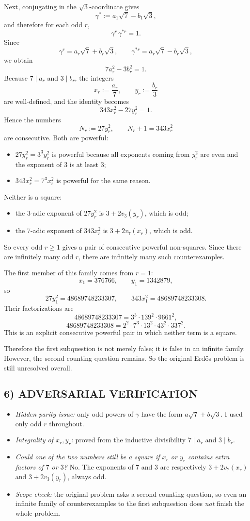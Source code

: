 Next, conjugating in the $\sqrt3$-coordinate gives
\[
\gamma^{\ast}:=a_1\sqrt7-b_1\sqrt3,
\]
and therefore for each odd $r$,
\[
\gamma^r\,\gamma^{\ast r}=1.
\]
Since
\[
\gamma^r=a_r\sqrt7+b_r\sqrt3,
\qquad
\gamma^{\ast r}=a_r\sqrt7-b_r\sqrt3,
\]
we obtain
\[
7a_r^2-3b_r^2=1.
\]
Because $7\mid a_r$ and $3\mid b_r$, the integers
\[
x_r:=\frac{a_r}{7},\qquad y_r:=\frac{b_r}{3}
\]
are well-defined, and the identity becomes
\[
343x_r^2-27y_r^2=1.
\]
Hence the numbers
\[
N_r:=27y_r^2,
\qquad
N_r+1=343x_r^2
\]
are consecutive.
Both are powerful:
\begin{itemize}
\item $27y_r^2=3^3y_r^2$ is powerful because all exponents coming from $y_r^2$ are even and the exponent of $3$ is at least $3$;
\item $343x_r^2=7^3x_r^2$ is powerful for the same reason.
\end{itemize}
Neither is a square:
\begin{itemize}
\item the $3$-adic exponent of $27y_r^2$ is $3+2v_3(y_r)$, which is odd;
\item the $7$-adic exponent of $343x_r^2$ is $3+2v_7(x_r)$, which is odd.
\end{itemize}
So every odd $r\ge 1$ gives a pair of consecutive powerful non-squares.
Since there are infinitely many odd $r$, there are infinitely many such counterexamples.

The first member of this family comes from $r=1$:
\[
x_1=376766,\qquad y_1=1342879,
\]
so
\[
27y_1^2=48689748233307,
\qquad
343x_1^2=48689748233308.
\]
Their factorizations are
\[
48689748233307=3^3\cdot 139^2\cdot 9661^2,
\]
\[
48689748233308=2^2\cdot 7^3\cdot 13^2\cdot 43^2\cdot 337^2.
\]
This is an explicit consecutive powerful pair in which neither term is a square.

Therefore the first subquestion is not merely false; it is false in an infinite family.
However, the second counting question remains. So the original Erd\H{o}s problem is still unresolved overall.

\subsection*{6) ADVERSARIAL VERIFICATION}
\begin{itemize}
\item \emph{Hidden parity issue:} only odd powers of $\gamma$ have the form $a\sqrt7+b\sqrt3$. I used only odd $r$ throughout.
\item \emph{Integrality of $x_r,y_r$:} proved from the inductive divisibility $7\mid a_r$ and $3\mid b_r$.
\item \emph{Could one of the two numbers still be a square if $x_r$ or $y_r$ contains extra factors of $7$ or $3$?} No. The exponents of $7$ and $3$ are respectively $3+2v_7(x_r)$ and $3+2v_3(y_r)$, always odd.
\item \emph{Scope check:} the original problem asks a second counting question, so even an infinite family of counterexamples to the first subquestion does \emph{not} finish the whole problem.
\end{itemize}

